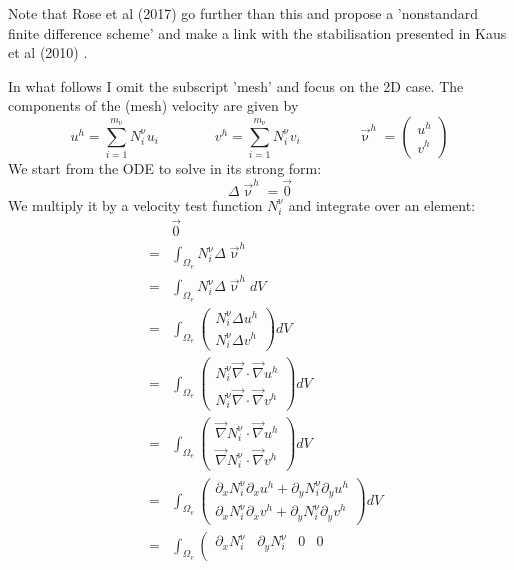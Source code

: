 Note that Rose et al (2017) \cite{robh17} go further than this and 
propose a 'nonstandard finite difference scheme' and make a 
link with the stabilisation presented in Kaus et al (2010) \cite{kamm10}.

In what follows I omit the subscript 'mesh' and focus on the 2D case. The components of the (mesh) velocity
are given by
\[
u^h = \sum_{i=1}^{m_\upnu} N_i^\upnu u_i
\qquad
\qquad
v^h = \sum_{i=1}^{m_\upnu} N_i^\upnu v_i
\qquad
\qquad
\vec{\upnu}^h=\left( 
\begin{array}{c}
u^h \\
v^h 
\end{array}  \right)
\]
We start from the ODE to solve in its strong form:
\[
\Delta \vec{\upnu}^h = \vec{0}
\]
We multiply it by a velocity test function $N_i^\upnu$ and integrate over an element: 
\begin{eqnarray}
&&\vec 0 \nonumber\\
&=& \int_{\Omega_e} N_i^\upnu  \Delta \vec{\upnu}^h \nonumber\\ 
&=&\int_{\Omega_e} N_i^\upnu \Delta \vec\upnu^h dV \nonumber\\
&=&\int_{\Omega_e}  \left(\begin{array}{c}
N_i^\upnu \Delta u^h \\
N_i^\upnu \Delta v^h 
\end{array}\right) dV \nonumber\\
&=&\int_{\Omega_e}  \left(\begin{array}{c}
N_i^\upnu \vec\nabla \cdot \vec\nabla u^h \\
N_i^\upnu \vec\nabla \cdot \vec\nabla v^h 
\end{array}\right) dV \nonumber\\
&=&
\int_{\Omega_e}   \left(\begin{array}{c}
\vec\nabla N_i^\upnu \cdot \vec\nabla u^h \\
\vec\nabla N_i^\upnu \cdot \vec\nabla v^h 
\end{array}\right) dV \nonumber\\
&=&
\int_{\Omega_e}
\left(\begin{array}{c}
\partial_x N_i^\upnu \partial_x u^h + \partial_y N_i^\upnu \partial_y u^h \\ 
\partial_x N_i^\upnu \partial_x v^h + \partial_y N_i^\upnu \partial_y v^h 
\end{array}\right) dV \nonumber\\
&=&\int_{\Omega_e}
\left(
\begin{array}{cccc}
\partial_x N_i^\upnu & \partial_y N_i^\upnu & 0 & 0 \\ 

\end{array}
\end{eqnarray}
